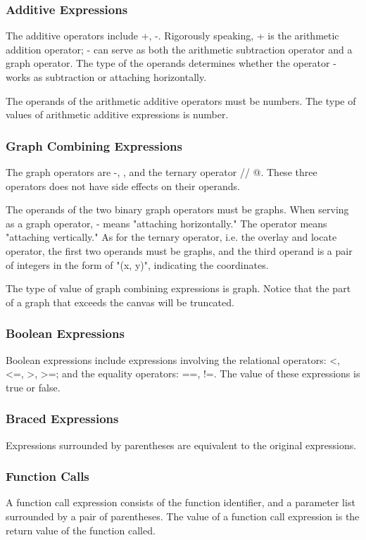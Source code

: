 \documentclass[11pt,letterpaper]{article}
\begin{document}
\subsubsection {Additive Expressions}
The additive operators include +, -. Rigorously speaking,  + is the arithmetic addition operator; - can serve as both the arithmetic subtraction operator and a graph operator. The type of the operands determines whether the operator - works as subtraction or attaching horizontally.

The operands of the arithmetic additive operators must be numbers. The type of values of arithmetic additive expressions is number.

\subsubsection {Graph Combining Expressions}
The graph operators are -, \textbar, and the ternary operator // @. These three operators does not have side effects on their operands.

The operands of the two binary graph operators must be graphs. When serving as a graph operator, - means "attaching horizontally." The operator \textbar means "attaching vertically." As for the ternary operator, i.e. the overlay and locate operator, the first two operands must be graphs, and the third operand is a pair of integers in the form of "(x, y)", indicating the coordinates.

The type of value of graph combining expressions is graph. Notice that the part of a graph that exceeds the canvas will be truncated.

\subsubsection {Boolean Expressions}
Boolean expressions include expressions involving the relational operators: <, <=, >, >=;  and the equality operators: ==, !=. The value of these expressions is true or false.

\subsubsection {Braced Expressions}
Expressions surrounded by parentheses are equivalent to the original expressions.

\subsubsection {Function Calls}
A function call expression consists of the function identifier, and a parameter list surrounded by a pair of parentheses. The value of a function call expression is the return value of the function called.
\end{document}
